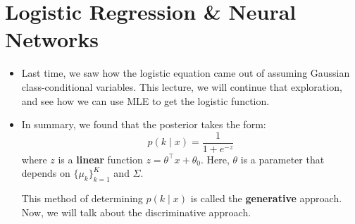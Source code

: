 \section{Logistic Regression \& Neural Networks}
\begin{itemize}
	\item Last time, we saw how the logistic equation came out of assuming Gaussian
		class-conditional variables. This lecture, we will continue that exploration,
		and see how we can use MLE to get the logistic function.
	\item In summary, we found that the posterior takes the form:
		\[
			p(k \mid x) = \frac{1}{1 + e^{-z}}
		\]
		where \( z \) is a \textbf{linear} function \( z = \theta^{\top} x + \theta_0
		\). Here, \( \theta \) is a parameter that depends on \( \{\mu_k\}_{k =
		1}^{K} \) and \( \Sigma \).  
		
		This method of determining \( p(k \mid x) \) is called the
		\textbf{generative} approach. Now, we will talk about the discriminative
		approach.  


\end{itemize}

